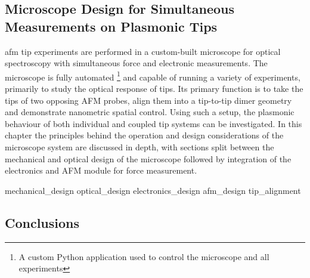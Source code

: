\documentclass[12pt, a4paper, oneside]{book}
\begin{document}
\begin{singlespace}
\color{white}\chapter{Microscope Design for Simultaneous Measurements on Plasmonic Tips}
\end{singlespace}


\Gls{afm} tip experiments are performed in a custom-built microscope for optical spectroscopy with simultaneous force and electronic measurements. The microscope is fully automated%
\footnote{A custom Python application used to control the microscope and all experiments}
and capable of running a variety of experiments, primarily to study the optical response of tips. Its primary function is to take the tips of two opposing AFM probes, align them into a tip-to-tip dimer geometry and demonstrate nanometric spatial control. Using such a setup, the plasmonic behaviour of both individual and coupled tip systems can be investigated. In this chapter the principles behind the operation and design considerations of the microscope system are discussed in depth, with sections split between the mechanical and optical design of the microscope followed by integration of the electronics and AFM module for force measurement.

{mechanical_design}
{optical_design}
{electronics_design}
{afm_design}
{tip_alignment}

\section{Conclusions}
\end{document}
